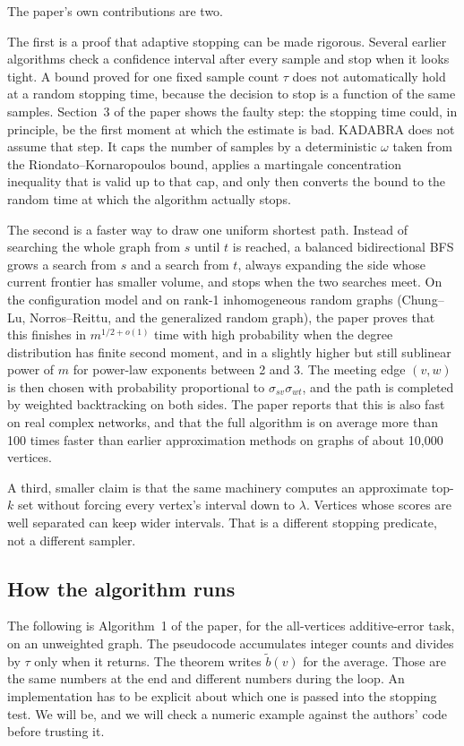 \documentclass[11pt]{article}
\begin{document}
The paper's own contributions are two.

The first is a proof that adaptive stopping can be made rigorous. Several earlier algorithms check a confidence interval after every sample and stop when it looks tight. A bound proved for one fixed sample count $\tau$ does not automatically hold at a random stopping time, because the decision to stop is a function of the same samples. Section~3 of the paper shows the faulty step: the stopping time could, in principle, be the first moment at which the estimate is bad. KADABRA does not assume that step. It caps the number of samples by a deterministic $\omega$ taken from the Riondato--Kornaropoulos bound, applies a martingale concentration inequality that is valid up to that cap, and only then converts the bound to the random time at which the algorithm actually stops.

The second is a faster way to draw one uniform shortest path. Instead of searching the whole graph from $s$ until $t$ is reached, a balanced bidirectional BFS grows a search from $s$ and a search from $t$, always expanding the side whose current frontier has smaller volume, and stops when the two searches meet. On the configuration model and on rank-1 inhomogeneous random graphs (Chung--Lu, Norros--Reittu, and the generalized random graph), the paper proves that this finishes in $m^{1/2+o(1)}$ time with high probability when the degree distribution has finite second moment, and in a slightly higher but still sublinear power of $m$ for power-law exponents between 2 and 3. The meeting edge $(v,w)$ is then chosen with probability proportional to $\sigma_{sv}\sigma_{wt}$, and the path is completed by weighted backtracking on both sides. The paper reports that this is also fast on real complex networks, and that the full algorithm is on average more than 100 times faster than earlier approximation methods on graphs of about 10{,}000 vertices.

A third, smaller claim is that the same machinery computes an approximate top-$k$ set without forcing every vertex's interval down to $\lambda$. Vertices whose scores are well separated can keep wider intervals. That is a different stopping predicate, not a different sampler.

\subsection{How the algorithm runs}

The following is Algorithm~1 of the paper, for the all-vertices additive-error task, on an unweighted graph. The pseudocode accumulates integer counts and divides by $\tau$ only when it returns. The theorem writes $\tilde b(v)$ for the average. Those are the same numbers at the end and different numbers during the loop. An implementation has to be explicit about which one is passed into the stopping test. We will be, and we will check a numeric example against the authors' code before trusting it.
\end{document}
